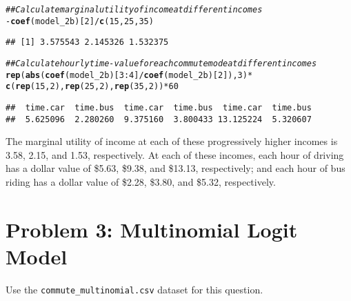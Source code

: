 \documentclass[11pt,letterpaper]{article}\usepackage[]{graphicx}\usepackage[]{color}
\makeatletter
\newcommand{\hlnum}[1]{\textcolor[rgb]{0.686,0.059,0.569}{#1}}%
\newcommand{\hlcom}[1]{\textcolor[rgb]{0.678,0.584,0.686}{\textit{#1}}}%
\newcommand{\hlopt}[1]{\textcolor[rgb]{0,0,0}{#1}}%
\newcommand{\hlstd}[1]{\textcolor[rgb]{0.345,0.345,0.345}{#1}}%
\newcommand{\hlkwd}[1]{\textcolor[rgb]{0.737,0.353,0.396}{\textbf{#1}}}%
\newenvironment{kframe}{%
 \def\at@end@of@kframe{}%
 \ifinner\ifhmode%
  \def\at@end@of@kframe{\end{minipage}}%
  \begin{minipage}{\columnwidth}%
 \fi\fi%
 \def\FrameCommand##1{\hskip\@totalleftmargin \hskip-\fboxsep
 \colorbox{shadecolor}{##1}\hskip-\fboxsep
     \hskip-\linewidth \hskip-\@totalleftmargin \hskip\columnwidth}%
 \MakeFramed {\advance\hsize-\width
   \@totalleftmargin\z@ \linewidth\hsize
   \@setminipage}}%
 {\par\unskip\endMakeFramed%
 \at@end@of@kframe}
\newenvironment{knitrout}{}{} %
\makeatother
\begin{document}
\begin{enumerate}[label=\alph*., leftmargin=*]
\begin{enumerate}[label=\roman*.]
\begin{knitrout}
\color{fgcolor}\begin{kframe}
\begin{alltt}
\hlcom{## Calculate marginal utility of income at different incomes}
\hlopt{-}\hlkwd{coef}\hlstd{(model_2b)[}\hlnum{2}\hlstd{]} \hlopt{/} \hlkwd{c}\hlstd{(}\hlnum{15}\hlstd{,} \hlnum{25}\hlstd{,} \hlnum{35}\hlstd{)}
\end{alltt}
\begin{verbatim}
## [1] 3.575543 2.145326 1.532375
\end{verbatim}
\begin{alltt}
\hlcom{## Calculate hourly time-value for each commute mode at different incomes}
\hlkwd{rep}\hlstd{(}\hlkwd{abs}\hlstd{(}\hlkwd{coef}\hlstd{(model_2b)[}\hlnum{3}\hlopt{:}\hlnum{4}\hlstd{]} \hlopt{/} \hlkwd{coef}\hlstd{(model_2b)[}\hlnum{2}\hlstd{]),} \hlnum{3}\hlstd{)} \hlopt{*}
  \hlkwd{c}\hlstd{(}\hlkwd{rep}\hlstd{(}\hlnum{15}\hlstd{,} \hlnum{2}\hlstd{),} \hlkwd{rep}\hlstd{(}\hlnum{25}\hlstd{,} \hlnum{2}\hlstd{),} \hlkwd{rep}\hlstd{(}\hlnum{35}\hlstd{,} \hlnum{2}\hlstd{))} \hlopt{*} \hlnum{60}
\end{alltt}
\begin{verbatim}
##  time.car  time.bus  time.car  time.bus  time.car  time.bus 
##  5.625096  2.280260  9.375160  3.800433 13.125224  5.320607
\end{verbatim}
\end{kframe}
\end{knitrout}

		The marginal utility of income at each of these progressively higher incomes is 3.58, 2.15, and 1.53, respectively. At each of these incomes, each hour of driving has a dollar value of \$5.63, \$9.38, and \$13.13, respectively; and each hour of bus riding has a dollar value of \$2.28, \$3.80, and \$5.32, respectively.
	\end{enumerate}
\end{enumerate}

\section*{Problem 3: Multinomial Logit Model}

Use the \texttt{commute\_multinomial.csv} dataset for this question.
\end{document}
